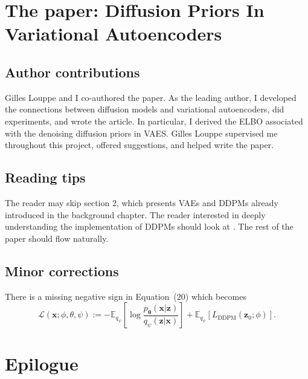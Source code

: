 \section{The paper: Diffusion Priors In Variational Autoencoders}

\subsection{Author contributions}
Gilles Louppe and I co-authored the paper. As the leading author, I developed the connections between diffusion models and variational autoencoders, did experiments, and wrote the article. In particular, I derived the ELBO associated with the denoising diffusion priors in VAES. Gilles Louppe supervised me throughout this project, offered suggestions, and helped write the paper.

\subsection{Reading tips}
The reader may skip section 2, which presents VAEs and DDPMs already introduced in the background chapter. The reader interested in deeply understanding the implementation of DDPMs should look at \citet{ho_denoising_2020}. The rest of the paper should flow naturally.

\subsection{Minor corrections}
There is a missing negative sign in Equation~(20) which becomes
$$\mathcal{L}(\mathbf{x}; \phi, \theta, \psi) := -\mathbb{E}_{q_{\psi}}\left[\log \frac{p_{\mathbf{\theta}}(\mathbf{x}|\mathbf{z})}{q_{\psi}(\mathbf{z}|\mathbf{x})} \right] + \mathbb{E}_{q_{\psi}}\left[ L_{\text{DDPM}}(\mathbf{z}_0; \phi)\right].$$



\section{Epilogue}
